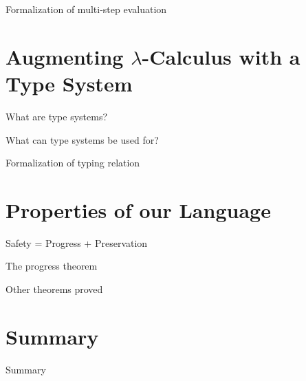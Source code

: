 \documentclass{beamer}
\begin{document}
\begin{frame}{Formalization of multi-step evaluation}
\end{frame}

\section{Augmenting $\lambda$-Calculus with a Type System}

\begin{frame}{What are type systems?}
\end{frame}

\begin{frame}{What can type systems be used for?}
\end{frame}

\begin{frame}{Formalization of typing relation}
\end{frame}

\section{Properties of our Language}

\begin{frame}{Safety = Progress + Preservation}
\end{frame}

\begin{frame}{The progress theorem}
\end{frame}

\begin{frame}{Other theorems proved}
\end{frame}

\section*{Summary}

\begin{frame}{Summary}
\end{frame}


\end{document}
